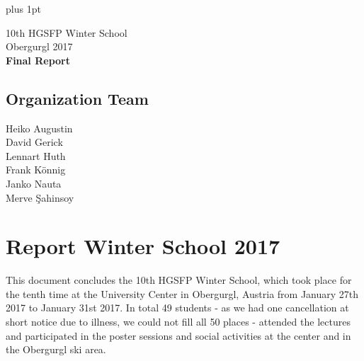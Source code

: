 \documentclass[11pt,a4paper]{article}
\numberwithin{equation}{section}
\numberwithin{table}{section}\setlength{\multlinegap}{25pt}
\begin{document}
\baselineskip=14pt
\parskip 5pt plus 1pt 


\vspace*{-1.5cm}
\begin{flushright}    %
  {\small

  }
\end{flushright}

\vspace{2cm}
\begin{center}        %
  {\LARGE 10th HGSFP Winter School}\\
   {\Large Obergurgl 2017}\\
   \vspace{2cm}
   {\LARGE \bf Final Report}
\end{center}
\pagestyle{empty}
\vspace{12cm}
%
\subsection*{Organization Team}
	Heiko Augustin \\
	David Gerick \\
	Lennart Huth \\
	Frank K\"onnig \\
	Janko Nauta \\
	Merve \c{S}ahinsoy \\


\newpage
\setcounter{page}{1}

\pagestyle{plain}

\section{Report Winter School 2017}

This document concludes the 10th HGSFP Winter School, which took place for the tenth time at the University Center in Obergurgl, Austria from January 27th 2017 to January 31st 2017. In total 49 students - as we had one cancellation at short notice due to illness, we could not fill all 50 places - attended the lectures and participated in the poster sessions and social activities at the center and in the Obergurgl ski area. 
\end{document}
